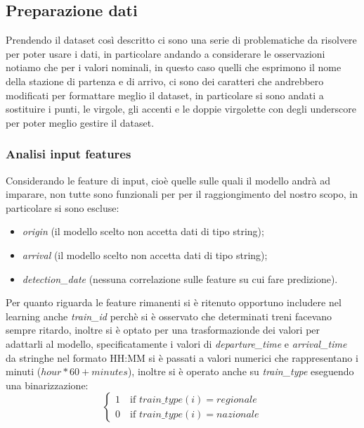 \documentclass[italian,12pt,a4paper]{article}
\begin{document}
	\subsection{Preparazione dati}
		Prendendo il dataset così descritto ci sono una serie di problematiche da risolvere per poter usare i dati, in particolare andando a considerare le osservazioni notiamo che per i valori nominali, in questo caso quelli che esprimono il nome della stazione di partenza e di arrivo, ci sono dei caratteri che andrebbero modificati per formattare meglio il dataset, in particolare si sono andati a sostituire i punti, le virgole, gli accenti e le doppie virgolette con degli underscore per poter meglio gestire il dataset.
		
		\subsubsection{Analisi input features}
			Considerando le feature di input, cioè quelle sulle quali il modello andrà ad imparare, non tutte sono funzionali per per il raggiongimento del nostro scopo, in particolare si sono escluse:
			
			\begin{itemize}
				\item \textit{origin} (il modello scelto non accetta dati di tipo string);
				\item \textit{arrival} (il modello scelto non accetta dati di tipo string);
				\item \textit{detection\_date} (nessuna correlazione sulle feature su cui fare predizione).
			\end{itemize}
			Per quanto riguarda le feature rimanenti si è ritenuto opportuno includere nel learning anche \textit{train\_id} perchè si è osservato che determinati treni facevano sempre ritardo, inoltre si è optato per una trasformazionde dei valori per adattarli al modello, specificatamente i valori di \textit{departure\_time} e \textit{arrival\_time} da stringhe nel formato HH:MM si è passati a valori numerici che rappresentano i minuti ($hour*60+minutes$), inoltre si è operato anche su \textit{train\_type} eseguendo una binarizzazione:
			\begin{equation*}
				\begin{cases}
					1 \quad \text{if } train\_type(i) = regionale \\
					0 \quad \text{if } train\_type(i) = nazionale
				\end{cases}
			\end{equation*}
			
\end{document}
